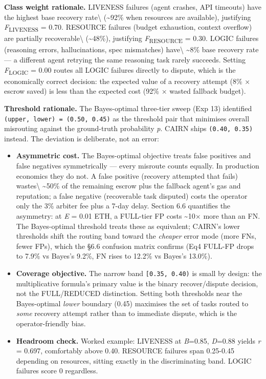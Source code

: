 \documentclass[
  10pt,
]{article}
\providecommand{\tightlist}{%
  \setlength{\itemsep}{0pt}\setlength{\parskip}{0pt}}
\begin{document}
\textbf{Class weight rationale.} LIVENESS failures (agent crashes, API
timeouts) have the highest base recovery rate\textbackslash{}
(\textasciitilde92\% when resources are available), justifying
\emph{F}\textsubscript{LIVENESS} = 0.70. RESOURCE failures (budget
exhaustion, context overflow) are partially recoverable\textbackslash{}
(\textasciitilde48\%), justifying \emph{F}\textsubscript{RESOURCE} =
0.30. LOGIC failures (reasoning errors, hallucinations, spec mismatches)
have\textbackslash{} \textasciitilde8\% base recovery rate --- a
different agent retrying the same reasoning task rarely succeeds.
Setting \emph{F}\textsubscript{LOGIC} = 0.00 routes all LOGIC failures
directly to dispute, which is the economically correct decision: the
expected value of a recovery attempt (8\% × escrow saved) is less than
the expected cost (92\% × wasted fallback budget).

\textbf{Threshold rationale.} The Bayes-optimal three-tier sweep (Exp
13) identified \texttt{(upper,\ lower)\ =\ (0.50,\ 0.45)} as the
threshold pair that minimises overall misrouting against the
ground-truth probability \emph{p}. CAIRN ships \texttt{(0.40,\ 0.35)}
instead. The deviation is deliberate, not an error:

\begin{itemize}
\tightlist
\item
  \textbf{Asymmetric cost.} The Bayes-optimal objective treats false
  positives and false negatives symmetrically --- every misroute counts
  equally. In production economics they do not. A false positive
  (recovery attempted that fails) wastes\textbackslash{}
  \textasciitilde50\% of the remaining escrow plus the fallback agent's
  gas and reputation; a false negative (recoverable task disputed) costs
  the operator only the 3\% arbiter fee plus a 7-day delay. Section 6.6
  quantifies the asymmetry: at \emph{E} = 0.01 ETH, a FULL-tier FP costs
  \textasciitilde10× more than an FN. The Bayes-optimal threshold treats
  these as equivalent; CAIRN's lower thresholds shift the routing band
  toward the \emph{cheaper} error mode (more FNs, fewer FPs), which the
  §6.6 confusion matrix confirms (Eq4 FULL-FP drops to 7.9\% vs Bayes's
  9.2\%, FN rises to 12.2\% vs Bayes's 13.0\%).
\item
  \textbf{Coverage objective.} The narrow band \texttt{{[}0.35,\ 0.40)}
  is small by design: the multiplicative formula's primary value is the
  binary recover/dispute decision, not the FULL/REDUCED distinction.
  Setting both thresholds near the Bayes-optimal \emph{lower} boundary
  (0.45) maximises the set of tasks routed to \emph{some} recovery
  attempt rather than to immediate dispute, which is the
  operator-friendly bias.
\item
  \textbf{Headroom check.} Worked example: LIVENESS at \emph{B}=0.85,
  \emph{D}=0.88 yields \emph{r} = 0.697, comfortably above 0.40.
  RESOURCE failures span 0.25-0.45 depending on resources, sitting
  exactly in the discriminating band. LOGIC failures score 0 regardless.
\end{itemize}
\end{document}
